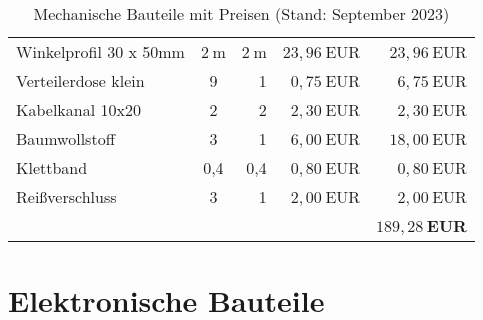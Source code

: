 \documentclass[./00PhotoBox.tex]{subfiles}
\begin{document}
\begin{table}[ht]
\begin{tabular}{l|c|r|r|r}
        Winkelprofil 30 x 50mm        & $2~$m   & $2~$m   & $23,96~$EUR & $23,96~$EUR           \\
        Verteilerdose klein           & 9       & 1       & $0,75~$EUR  & $6,75~$EUR            \\
        Kabelkanal 10x20              & 2       & 2       & $2,30~$EUR  & $2,30~$EUR            \\
        Baumwollstoff                 & 3       & 1       & $6,00~$EUR  & $18,00~$EUR           \\
        Klettband                     & 0,4     & 0,4     & $0,80~$EUR  & $0,80~$EUR            \\
        Reißverschluss                & 3       & 1       & $2,00~$EUR  & $2,00~$EUR            \\
                                      &         &         &             & \textbf{$189,28~$EUR} \\
    \end{tabular}
    \caption{Mechanische Bauteile mit Preisen (Stand: September 2023)}
    \label{tab:bauteile_mechanisch}
\end{table}

\clearpage

\section{Elektronische Bauteile}
\end{document}
